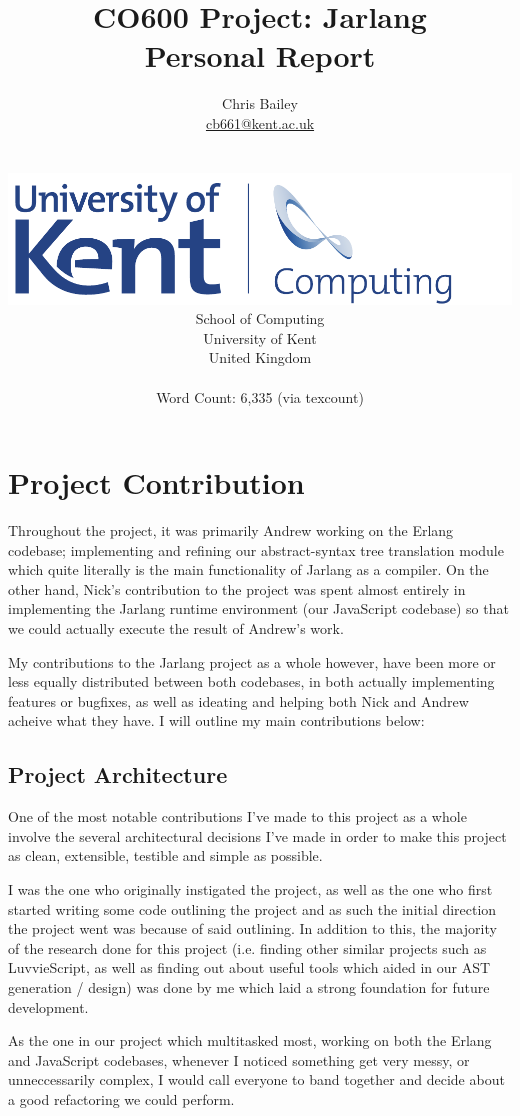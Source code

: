 \documentclass[twoside,12pt,titlepage,a4paper]{article}
\title{CO600 Project: Jarlang\\ Personal Report}
\author{
	\begin{tabular}{ c c c }
		Chris Bailey\\
		\url{cb661@kent.ac.uk}
	\end{tabular}\\
	\\ \vspace{10mm}
		\includegraphics[scale=0.6]{Kent_Comp_294_RGB} \\
		School of Computing \\
		University of Kent \\
		United Kingdom \\ \vspace{10mm} \\ Word Count: 6,335 (via texcount)}
\begin{document}
\maketitle
\restoregeometry              %

\section{Project Contribution}
\label{Project Contribution}
	Throughout the project, it was primarily Andrew working on the Erlang codebase; implementing and refining
	our abstract-syntax tree translation module which quite literally is the main functionality of Jarlang as a compiler. On
	the other hand, Nick's contribution to the project was spent almost entirely in implementing the Jarlang runtime environment 
	(our JavaScript codebase) so that we could actually execute the result of Andrew's work.

	My contributions to the Jarlang project as a whole however, have been more or less equally distributed between both codebases,
	in both actually implementing features or bugfixes, as well as ideating and helping both Nick and Andrew acheive what they have.
	I will outline my main contributions below:

	\subsection{Project Architecture}
		One of the most notable contributions I've made to this project as a whole involve the several architectural decisions
		I've made in order to make this project as clean, extensible, testible and simple as possible.

		I was the one who originally instigated the project, as well as the one who first started writing some code outlining
		the project and as such the initial direction the project went was because of said outlining. In addition to this,
		the majority of the research done for this project (i.e. finding other similar projects such as LuvvieScript, as
		well as finding out about useful tools which aided in our AST generation / design) was done by me which laid a
		strong foundation for future development.

		As the one in our project which multitasked most, working on both the Erlang and JavaScript codebases, whenever I noticed
		something get very messy, or unneccessarily complex, I would call everyone to band together and decide about a good
		refactoring we could perform. 
		
\end{document}
